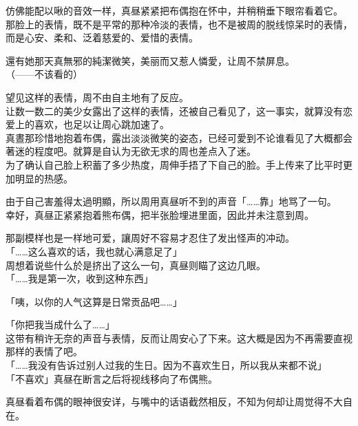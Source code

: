 仿佛能配以啾的音效一样，真昼紧紧把布偶抱在怀中，并稍稍垂下眼帘看着它。\\

那脸上的表情，既不是平常的那种冷淡的表情，也不是被周的脱线惊呆时的表情，而是心安、柔和、泛着慈爱的、爱惜的表情。

還有她那天真無邪的純潔微笑，美丽而又惹人憐愛，让周不禁屏息。\\

（——不该看的）

望见这样的表情，周不由自主地有了反应。\\%

让数一数二的美少女露出了这样的表情，还被自己看见了，这一事实，就算没有恋爱上的喜欢，也足以让周心跳加速了。\\%

真晝那珍惜地抱着布偶，露出淡淡微笑的姿态，已经可愛到不论谁看见了大概都会著迷的程度吧。就算是自认为无欲无求的周也差点入了迷。\\

为了确认自己脸上积蓄了多少热度，周伸手捂了下自己的脸。手上传来了比平时更加明显的热感。

由于自己害羞得太過明顯，所以周用真昼听不到的声音「……靠」地骂了一句。\\

幸好，真昼正紧紧抱着熊布偶，把半张脸埋进里面，因此并未注意到周。

那副模样也是一样地可爱，讓周好不容易才忍住了发出怪声的冲动。\\

「……这么喜欢的话，我也就心满意足了」\\

周想着说些什么於是挤出了这么一句，真昼则瞄了这边几眼。\\

「……我是第一次，收到这种东西」

「咦，以你的人气这算是日常贡品吧……」

「你把我当成什么了……」\\

这带有稍许无奈的声音与表情，反而让周安心了下来。这大概是因为不再需要直视那样的表情了吧。\\

「……我没有告诉过别人过我的生日。因为不喜欢生日，所以我从来都不说」\\

「不喜欢」真昼在断言之后将视线移向了布偶熊。

真昼看着布偶的眼神很安详，与嘴中的话语截然相反，不知为何却让周觉得不大自在。\\

